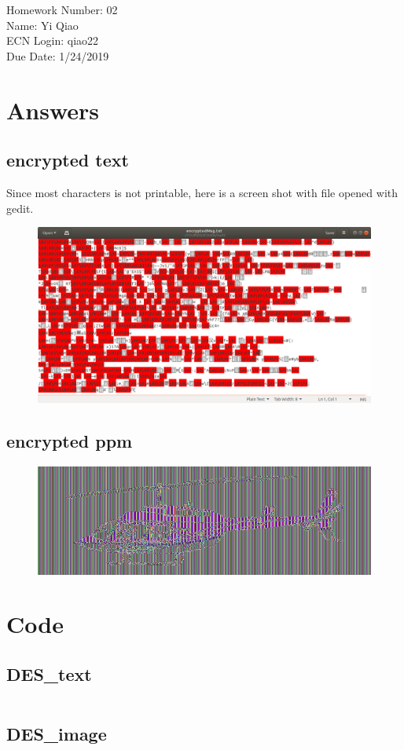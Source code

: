 \documentclass[11pt]{article}
\begin{document}
\noindent Homework Number: 02\\
Name: Yi Qiao\\
ECN Login: qiao22\\
Due Date: 1/24/2019\\
\section*{Answers}

\subsection*{encrypted text}
Since most characters is not printable, here is a screen shot with file opened with gedit.
\begin{figure}[h]
\centering
\includegraphics[width=0.8\linewidth]{encryptedMsg.png}
\end{figure}

\subsection*{encrypted ppm}
\begin{figure}[h]
\centering
\includegraphics[width=0.8\linewidth]{image_enc.jpg}
\end{figure}
\pagebreak

\section*{Code}
\subsection*{DES\_text}
\inputminted[breaklines]{python}{DES_text.py}
\pagebreak
\subsection*{DES\_image}
\inputminted[breaklines]{python}{DES_image.py}
\end{document}
